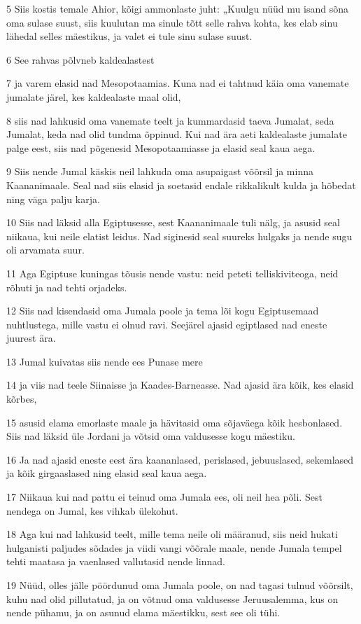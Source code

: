 \par 5 Siis kostis temale Ahior, kõigi ammonlaste juht: „Kuulgu nüüd mu isand sõna oma sulase suust, siis kuulutan ma sinule tõtt selle rahva kohta, kes elab sinu lähedal selles mäestikus, ja valet ei tule sinu sulase suust.
\par 6 See rahvas põlvneb kaldealastest
\par 7 ja varem elasid nad Mesopotaamias. Kuna nad ei tahtnud käia oma vanemate jumalate järel, kes kaldealaste maal olid,
\par 8 siis nad lahkusid oma vanemate teelt ja kummardasid taeva Jumalat, seda Jumalat, keda nad olid tundma õppinud. Kui nad ära aeti kaldealaste jumalate palge eest, siis nad põgenesid Mesopotaamiasse ja elasid seal kaua aega.
\par 9 Siis nende Jumal käskis neil lahkuda oma asupaigast võõrsil ja minna Kaananimaale. Seal nad siis elasid ja soetasid endale rikkalikult kulda ja hõbedat ning väga palju karja.
\par 10 Siis nad läksid alla Egiptusesse, sest Kaananimaale tuli nälg, ja asusid seal niikaua, kui neile elatist leidus. Nad siginesid seal suureks hulgaks ja nende sugu oli arvamata suur.
\par 11 Aga Egiptuse kuningas tõusis nende vastu: neid peteti telliskiviteoga, neid rõhuti ja nad tehti orjadeks.
\par 12 Siis nad kisendasid oma Jumala poole ja tema lõi kogu Egiptusemaad nuhtlustega, mille vastu ei olnud ravi. Seejärel ajasid egiptlased nad eneste juurest ära.
\par 13 Jumal kuivatas siis nende ees Punase mere
\par 14 ja viis nad teele Siinaisse ja Kaades-Barneasse. Nad ajasid ära kõik, kes elasid kõrbes,
\par 15 asusid elama emorlaste maale ja hävitasid oma sõjaväega kõik hesbonlased. Siis nad läksid üle Jordani ja võtsid oma valdusesse kogu mäestiku.
\par 16 Ja nad ajasid eneste eest ära kaananlased, perislased, jebuuslased, sekemlased ja kõik girgaaslased ning elasid seal kaua aega.
\par 17 Niikaua kui nad pattu ei teinud oma Jumala ees, oli neil hea põli. Sest nendega on Jumal, kes vihkab ülekohut.
\par 18 Aga kui nad lahkusid teelt, mille tema neile oli määranud, siis neid hukati hulganisti paljudes sõdades ja viidi vangi võõrale maale, nende Jumala tempel tehti maatasa ja vaenlased vallutasid nende linnad.
\par 19 Nüüd, olles jälle pöördunud oma Jumala poole, on nad tagasi tulnud võõrsilt, kuhu nad olid pillutatud, ja on võtnud oma valdusesse Jeruusalemma, kus on nende pühamu, ja on asunud elama mäestikku, sest see oli tühi.
